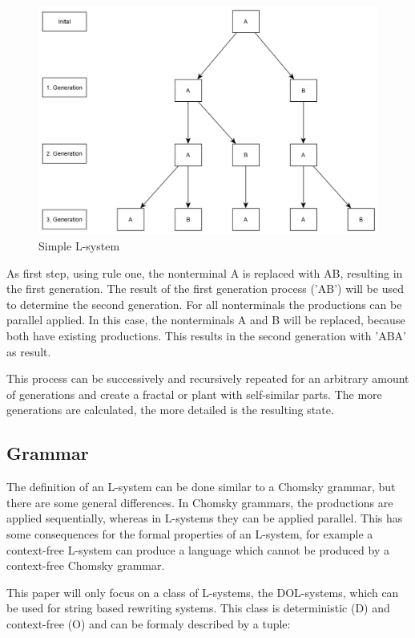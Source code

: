 \documentclass[english]{cpp-hmwk}
\begin{document}
\begin{figure}[h!]
	\centering
	\includegraphics[width=0.7\columnwidth]{../graphs/Examples/simple_lsystem.png}
	\caption{Simple L-system}
	\label{figure:simple_lsystem}
\end{figure}

As first step, using rule one, the nonterminal A is replaced with AB, resulting in the first generation. The result of the first generation process ('AB') will be used to determine the second generation. For all nonterminals the productions can be parallel applied. In this case, the nonterminals A and B will be replaced, because both have existing productions. This results in the second generation with 'ABA' as result.

\noindent This process can be successively and recursively repeated for an arbitrary amount of generations and create a fractal or plant with self-similar parts. The more generations are calculated, the more detailed is the resulting state. 

\subsection{Grammar}
\label{section:grammar}
The definition of an L-system can be done similar to a Chomsky grammar, but there are some general differences. In Chomsky grammars, the productions are applied sequentially, whereas in L-systems they can be applied parallel. This has some consequences for the formal properties of an L-system, for example a context-free L-system can produce a language which cannot be produced by a context-free Chomsky grammar.\cite[Cf. Chapter 1.1, p.~3]{prusinkiewiczp.lindenmayera.2004}

\noindent This paper will only focus on a class of L-systems, the DOL-systems, which can be used for string based rewriting systems. This class is deterministic (D) and context-free (O) and can be formaly described  by a tuple:
\end{document}
